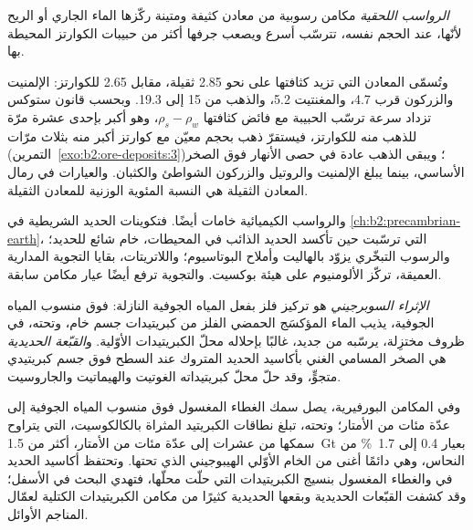 \begin{definition}\label{def:b2:ore-deposits:placer}
\emph{الرواسب اللحقية} مكامن رسوبية من معادن كثيفة ومتينة ركّزها
الماء الجاري أو الريح لأنّها، عند الحجم نفسه، تترسّب أسرع ويصعب جرفها أكثر
من حبيبات الكوارتز المحيطة بها.
\end{definition}

وتُسمّى المعادن التي تزيد كثافتها على نحو 2.85 ثقيلة، مقابل 2.65 للكوارتز: الإلمنيت والزركون
قرب 4.7، والمغنتيت 5.2، والذهب من 15 إلى 19.3. وبحسب قانون ستوكس تزداد سرعة ترسّب الحبيبة مع
فائض كثافتها $\rho_s - \rho_w$، وهو أكبر بإحدى عشرة مرّة للذهب منه للكوارتز، فيستقرّ ذهب
بحجم معيّن مع كوارتز أكبر منه بثلاث مرّات (التمرين~\ref{exo:b2:ore-deposits:3})؛ ويبقى الذهب
عادة في حصى الأنهار فوق الصخر الأساسي، بينما يبلغ الإلمنيت والروتيل والزركون الشواطئ
والكثبان. والعيارات في رمال المعادن الثقيلة هي النسبة المئوية الوزنية للمعادن الثقيلة.

والرواسب الكيميائية خامات أيضًا. فتكوينات الحديد الشريطية في \cref{ch:b2:precambrian-earth}،
التي ترسّبت حين تأكسد الحديد الذائب في المحيطات، خام شائع للحديد؛ والرسوب التبخّري
يزوّد بالهاليت وأملاح البوتاسيوم؛ واللاتريتات، بقايا التجوية المدارية العميقة،
تركّز الألومنيوم على هيئة بوكسيت. والتجوية ترفع أيضًا عيار مكامن سابقة.

\begin{definition}\label{def:b2:ore-deposits:supergene}
\emph{الإثراء السوبرجيني} هو تركيز فلز بفعل
المياه الجوفية النازلة: فوق منسوب المياه الجوفية، يذيب الماء المؤكسَج الحمضي الفلز من
كبريتيدات جسم خام، وتحته، في ظروف مختزِلة، يرسّبه من جديد، غالبًا بإحلاله
محلّ الكبريتيدات الأوّلية. و\emph{القبّعة الحديدية} هي الصخر المسامي الغني بأكاسيد الحديد
المتروك عند السطح فوق جسم كبريتيدي متجوٍّ، وقد حلّ محلّ كبريتيداته الغوتيت والهيماتيت
والجاروسيت.
\end{definition}

وفي المكامن البورفيرية، يصل سمك الغطاء المغسول فوق منسوب المياه الجوفية إلى عدّة مئات من
الأمتار؛ وتحته، تبلغ نطاقات الكبريتيد المثراة بالكالكوسيت، التي يتراوح سمكها من عشرات إلى عدّة مئات من الأمتار،
أكثر من \qty{1.5}{Gt} بعيار 0.4 إلى \qty{1.7}{\percent} من النحاس، وهي دائمًا أغنى من الخام الأوّلي
الهيبوجيني الذي تحتها. وتحتفظ أكاسيد الحديد في  والغطاء المغسول بنسيج
الكبريتيدات التي حلّت محلّها، فتهدي البحث في الأسفل؛ وقد كشفت القبّعات الحديدية وبقعها الحديدية
كثيرًا من مكامن الكبريتيدات الكتلية لعمّال المناجم الأوائل.

